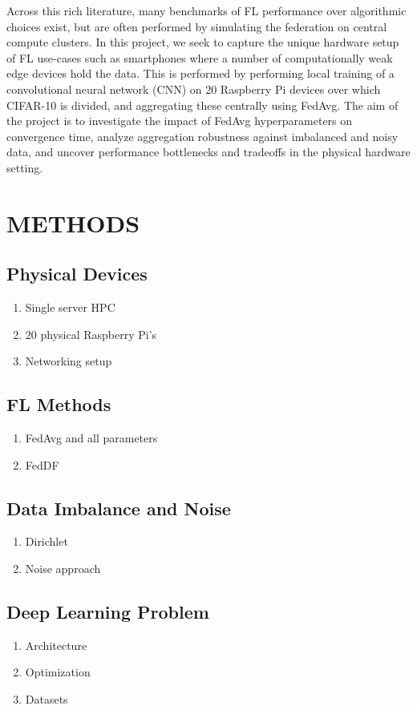 \documentclass{article}
\begin{document}
Across this rich literature, many benchmarks of FL performance over algorithmic choices exist, but are often performed by simulating the federation on central compute clusters.
In this project, we seek to capture the unique hardware setup of FL use-cases such as smartphones where a number of computationally weak edge devices hold the data.
This is performed by performing local training of a convolutional neural network (CNN) on 20 Raspberry Pi devices over which CIFAR-10 \cite{alex2009learning} is divided, and aggregating these centrally using FedAvg.
The aim of the project is to investigate the impact of FedAvg hyperparameters on convergence time, analyze aggregation robustness against imbalanced and noisy data, and uncover performance bottlenecks and tradeoffs in the physical hardware setting.

\section{METHODS}%
\label{sec:methods}
\subsection{Physical Devices}
\begin{enumerate}
    \item Single server HPC 
    \item 20 physical Raspberry Pi's
    \item Networking setup
\end{enumerate}

\subsection{FL Methods}
\begin{enumerate}
    \item FedAvg and all parameters
    \item FedDF
\end{enumerate}

\subsection{Data Imbalance and Noise}
\begin{enumerate}
    \item Dirichlet
    \item Noise approach
\end{enumerate}

\subsection{Deep Learning Problem}
\begin{enumerate}
    \item Architecture
    \item Optimization
    \item Datasets
\end{enumerate}
\end{document}
